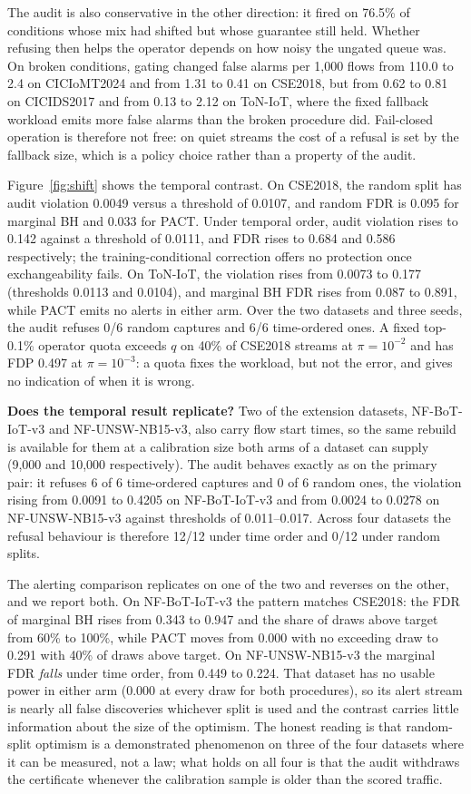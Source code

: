 \documentclass[a4paper,fleqn]{cas-dc}
\newcommand{\PACT}{PACT\xspace}
\begin{document}
The audit is also conservative in the other direction: it fired on 76.5\% of conditions whose mix had shifted but whose guarantee still held. Whether refusing then helps the operator depends on how noisy the ungated queue was. On broken conditions, gating changed false alarms per 1,000 flows from 110.0 to 2.4 on CICIoMT2024 and from 1.31 to 0.41 on CSE2018, but from 0.62 to 0.81 on CICIDS2017 and from 0.13 to 2.12 on ToN-IoT, where the fixed fallback workload emits more false alarms than the broken procedure did. Fail-closed operation is therefore not free: on quiet streams the cost of a refusal is set by the fallback size, which is a policy choice rather than a property of the audit.

Figure~\ref{fig:shift} shows the temporal contrast. On CSE2018, the random split has audit violation 0.0049 versus a threshold of 0.0107, and random FDR is 0.095 for marginal BH and 0.033 for \PACT. Under temporal order, audit violation rises to 0.142 against a threshold of 0.0111, and FDR rises to 0.684 and 0.586 respectively; the training-conditional correction offers no protection once exchangeability fails. On ToN-IoT, the violation rises from 0.0073 to 0.177 (thresholds 0.0113 and 0.0104), and marginal BH FDR rises from 0.087 to 0.891, while \PACT emits no alerts in either arm. Over the two datasets and three seeds, the audit refuses 0/6 random captures and 6/6 time-ordered ones. A fixed top-0.1\% operator quota exceeds $q$ on 40\% of CSE2018 streams at $\pi=10^{-2}$ and has FDP 0.497 at $\pi=10^{-3}$: a quota fixes the workload, but not the error, and gives no indication of when it is wrong.

\textbf{Does the temporal result replicate?} Two of the extension datasets, NF-BoT-IoT-v3 and NF-UNSW-NB15-v3, also carry flow start times, so the same rebuild is available for them at a calibration size both arms of a dataset can supply (9,000 and 10,000 respectively). The audit behaves exactly as on the primary pair: it refuses 6 of 6 time-ordered captures and 0 of 6 random ones, the violation rising from 0.0091 to 0.4205 on NF-BoT-IoT-v3 and from 0.0024 to 0.0278 on NF-UNSW-NB15-v3 against thresholds of 0.011--0.017. Across four datasets the refusal behaviour is therefore 12/12 under time order and 0/12 under random splits.

The alerting comparison replicates on one of the two and reverses on the other, and we report both. On NF-BoT-IoT-v3 the pattern matches CSE2018: the FDR of marginal BH rises from 0.343 to 0.947 and the share of draws above target from 60\% to 100\%, while \PACT moves from 0.000 with no exceeding draw to 0.291 with 40\% of draws above target. On NF-UNSW-NB15-v3 the marginal FDR \emph{falls} under time order, from 0.449 to 0.224. That dataset has no usable power in either arm (0.000 at every draw for both procedures), so its alert stream is nearly all false discoveries whichever split is used and the contrast carries little information about the size of the optimism. The honest reading is that random-split optimism is a demonstrated phenomenon on three of the four datasets where it can be measured, not a law; what holds on all four is that the audit withdraws the certificate whenever the calibration sample is older than the scored traffic.
\end{document}
